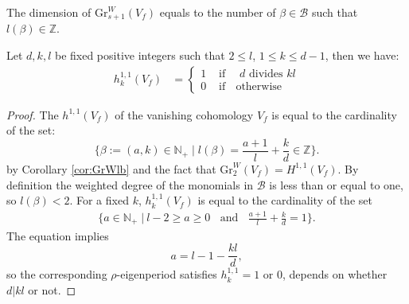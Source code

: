 \documentclass[10pt,a4paper]{amsart}
\begin{document}
\begin{corollary}\label{cor:GrWlb}
The dimension of $\mathrm{Gr}_{s+1}^{W}(V_f)$ equals to the number of $\beta\in \mathcal{B}$ such that $l(\beta)\in \mathbb{Z}$.
\end{corollary}

\begin{corollary}\label{maincorollary}
Let $d, k, l$ be fixed positive integers such that  
$2 \leq l$, $1\leq k \leq d-1$, then we have:
\begin{align*}
h^{1,1}_k\left(  V_f \right) 
&=
\begin{cases}
1 & \text{ if } \;  \text{ $d$ divides $kl$} \\
0 & \text{ if } \;  \text{ otherwise }  
\end{cases}
\end{align*}
\end{corollary}

\begin{proof}
The $h^{1,1}(V_f)$ of the vanishing cohomology $V_f$ is equal to the cardinality of the set:  
$$
\{
\beta:= (a,k) \in \mathbb{N}_+
\; |\; 
l(\beta) = \frac{a+1}{l}+\frac{k}{d}\in \mathbb{Z}\}.
$$
by Corollary \ref{cor:GrWlb}  and the fact that $\mathrm{Gr}^{W}_2(V_f) = H^{1,1}(V_f)$. 
By definition the weighted degree of the monomials in $\mathcal{B}$
is less than or equal to one, so $l(\beta)< 2$. For a fixed $k$, $h^{1,1}_k(V_f)$
is equal to the cardinality of the set
\begin{align*}
\lbrace
a \in \mathbb{N}_{+} \; | \
l-2 \geq a \geq 0 
\;\; \text{ and } \;\;
\frac{a+1}{l}+\frac{k}{d}=1
\rbrace.
\end{align*}
The equation implies
\[
a = 
l-1-\frac{kl}{d},
\]
so the corresponding $\rho$-eigenperiod satisfies $h_k^{1,1}=1$ or $0$, depends on whether $d|kl$ or not.  
\end{proof}
\end{document}
